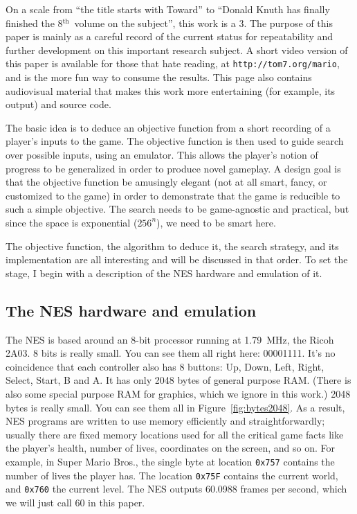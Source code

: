 \documentclass[twocolumn]{article}
\renewcommand\th{$^{\mathrm{th}}$}
\begin{document}
On a scale from ``the title starts with Toward'' to ``Donald Knuth has finally finished the 8\th\ volume on the subject'', this work is a 3. The purpose of this paper is mainly as a careful record of the current status for repeatability and further development on this important research subject. A short video version of this paper is available for those that hate reading, at \verb+http://tom7.org/mario+, and is the more fun way to consume the results. This page also contains audiovisual material that makes this work more entertaining (for example, its output) and source code.

The basic idea is to deduce an objective function from a short recording of a player's inputs to the game. The objective function is then used to guide search over possible inputs, using an emulator. This allows the player's notion of progress to be generalized in order to produce novel gameplay. A design goal is that the objective function be amusingly elegant (not at all smart, fancy, or customized to the game) in order to demonstrate that the game is reducible to such a simple objective. The search needs to be game-agnostic and practical, but since the space is exponential ($256^{n}$), we need to be smart here.

The objective function, the algorithm to deduce it, the search strategy, and its implementation are all interesting and will be discussed in that order. To set the stage, I begin with a description of the NES hardware and emulation of it.

\subsection{The NES hardware and emulation}
The NES is based around an 8-bit processor running at 1.79~MHz, the Ricoh 2A03. 8 bits is really small. You can see them all right here: 00001111. It's no coincidence that each controller also has 8 buttons: Up, Down, Left, Right, Select, Start, B and A. It has only 2048 bytes of general purpose RAM. (There is also some special purpose RAM for graphics, which we ignore in this work.) 2048 bytes is really small. You can see them all in Figure~\ref{fig:bytes2048}. As a result, NES programs are written to use memory efficiently and straightforwardly; usually there are fixed memory locations used for all the critical game facts like the player's health, number of lives, coordinates on the screen, and so on. For example, in Super Mario Bros., the single byte at location \verb+0x757+ contains the number of lives the player has. The location \verb+0x75F+ contains the current world, and \verb+0x760+ the current level. The NES outputs 60.0988 frames per second, which we will just call 60 in this paper.
\end{document}
